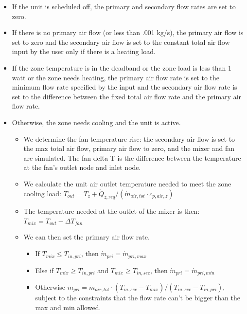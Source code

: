 \begin{itemize}
  \item
    If the unit is scheduled off, the primary and secondary flow rates are set to zero.
  \item
    If there is no primary air flow (or less than .001 kg/s), the primary air flow is set to zero and the secondary air flow is set to the constant total air flow input by the user only if there is a heating load.
  \item
    If the zone temperature is in the deadband or the zone load is less than 1 watt or the zone needs heating, the primary air flow rate is set to the minimum flow rate specified by the input and the secondary air flow rate is set to the difference between the fixed total air flow rate and the primary air flow rate.
  \item
    Otherwise, the zone needs cooling and the unit is active.
    \begin{itemize}
      \item 
        We determine the fan temperature rise: the secondary air flow is set to the max total air flow, primary air flow to zero, and the mixer and fan are simulated. The fan delta T is the difference between the temperature at the fan's outlet node and inlet node.
      \item
        We calculate the unit air outlet temperature needed to meet the zone cooling load: \({T_{out}} = {T_{z}} + {\dot Q_{z,req}}/({\dot m_{air,tot}}\cdot {c_{p,air,z}})\)
      \item
        The temperature needed at the outlet of the mixer is then: \({T_{mix}} = {T_{out}} - \Delta {T_{fan}}\)
      \item
        We can then set the primary air flow rate.
        \begin{itemize}
          \item
            If \({T_{mix}} \le {T_{in,pri}}\), then \({\dot m_{pri}} = {\dot m_{pri,max}}\)
          \item
            Else if \({T_{mix}} \ge {T_{in,pri}}\) and \({T_{mix}} \ge {T_{in,sec}}\), then \({\dot m_{pri}} = {\dot m_{pri,min}}\)
          \item
            Otherwise \({\dot m_{pri}} = {\dot m_{air,tot}}\cdot ({T_{in,sec}} - {T_{mix}})/({T_{in,sec}} - {T_{in,pri}})\), subject to the constraints that the flow rate can't be bigger than the max and min allowed.
        \end{itemize}
    \end{itemize}
\end{itemize}

